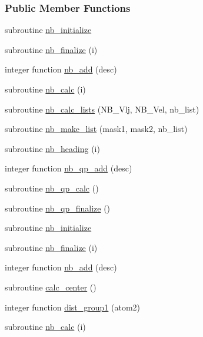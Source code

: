 \subsubsection*{Public Member Functions}
\begin{DoxyCompactItemize}
\item 
subroutine \hyperlink{classcalc__nb_a1bbfcf548dec05c1bb35e51bb01451ee}{nb\-\_\-initialize}
\item 
subroutine \hyperlink{classcalc__nb_ad4b4eb1aad0d5e40cbf07579ca5306de}{nb\-\_\-finalize} (i)
\item 
integer function \hyperlink{classcalc__nb_a1476bae2c246aa70d62c2d574e1c3878}{nb\-\_\-add} (desc)
\item 
subroutine \hyperlink{classcalc__nb_ab5ed70a50d41bb040e21f2e88ca8a207}{nb\-\_\-calc} (i)
\item 
subroutine \hyperlink{classcalc__nb_a600889d4c85c927366dcdf744c4299e9}{nb\-\_\-calc\-\_\-lists} (N\-B\-\_\-\-Vlj, N\-B\-\_\-\-Vel, nb\-\_\-list)
\item 
subroutine \hyperlink{classcalc__nb_a89a57b491ed84c3a4ddc05a0c379613d}{nb\-\_\-make\-\_\-list} (mask1, mask2, nb\-\_\-list)
\item 
subroutine \hyperlink{classcalc__nb_aa0c90f5c7303a22f778585374acc4a5f}{nb\-\_\-heading} (i)
\item 
integer function \hyperlink{classcalc__nb_a6d26079e3680e2780d8c7f302b538596}{nb\-\_\-qp\-\_\-add} (desc)
\item 
subroutine \hyperlink{classcalc__nb_a936e04ca43919cd2cacfd48dbfac7d52}{nb\-\_\-qp\-\_\-calc} ()
\item 
subroutine \hyperlink{classcalc__nb_ac6032c768a8f42bc47e597e359478356}{nb\-\_\-qp\-\_\-finalize} ()
\item 
subroutine \hyperlink{classcalc__nb_a1bbfcf548dec05c1bb35e51bb01451ee}{nb\-\_\-initialize}
\item 
subroutine \hyperlink{classcalc__nb_ad4b4eb1aad0d5e40cbf07579ca5306de}{nb\-\_\-finalize} (i)
\item 
integer function \hyperlink{classcalc__nb_a1476bae2c246aa70d62c2d574e1c3878}{nb\-\_\-add} (desc)
\item 
subroutine \hyperlink{classcalc__nb_a164c516267a3ae4e3afc88523d7155fc}{calc\-\_\-center} ()
\item 
integer function \hyperlink{classcalc__nb_afe6975ab0a29b879c799dba1d76b9b8f}{dist\-\_\-group1} (atom2)
\item 
subroutine \hyperlink{classcalc__nb_ab5ed70a50d41bb040e21f2e88ca8a207}{nb\-\_\-calc} (i)

\end{DoxyCompactItemize}
